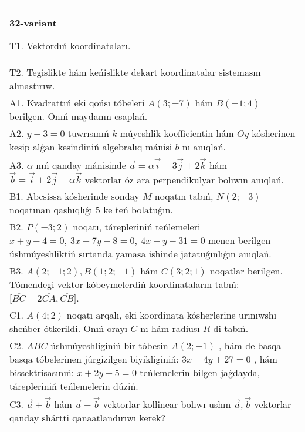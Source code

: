 \documentclass{article}
\begin{document}
\begin{tabular}{m{17cm}}
\textbf{32-variant}
\newline

T1. 
Vektordıń koordinataları.
 \\
T2. Tegislikte hám keńislikte dekart koordinatalar sistemasın almastırıw. 
 \\
A1. 
Kvadrattıń eki qońsı tóbeleri $A(3; -7)$ hám
$B(-1;4)$ berilgen. Onıń maydanın esaplań.
 \\
A2. 
$y-3=0$ tuwrısınıń $k$ múyeshlik
koefficientin hám $Oy$ kósherinen kesip alǵan kesindiniń algebralıq
mánisi $b$ nı anıqlań.
 \\
A3. 
$\alpha$
nıń qanday mánisinde
$\overrightarrow{a} = \alpha\overrightarrow{i} - 3\overrightarrow{j} + 2\overrightarrow{k}$
hám
$\overrightarrow{b} = \overrightarrow{i} + 2\overrightarrow{j} - \alpha\overrightarrow{k}$
vektorlar óz ara perpendikulyar bolıwın anıqlań. 
 \\
B1. 
Abcsissa kósherinde sonday $M$ noqatın tabıń,
\(N(2;-3)\) noqatınan qashıqlıǵı 5 ke teń bolatuǵın.
 \\
B2. 
\(P(-3;2)\) noqatı, tárepleriniń teńlemeleri
\(x+y-4=0,\ 3x-7y+8=0,\ 4x-y-31=0\) menen
berilgen úshmúyeshliktiń sırtanda yamasa ishinde jatatuǵınlıǵın anıqlań.
 \\
B3. 
$A (2; -1;2),B (1;2; - 1) $ hám $C (3;2;1) $ noqatlar berilgen. Tómendegi vektor kóbeymelerdiń koordinataların tabıń: 
$\lbrack\overline{BC} - 2\overline{CA},\overline{CB}\rbrack$.
 \\
C1. \(A(4;2)\) noqatı arqalı, eki koordinata kósherlerine
urınıwshı sheńber ótkerildi. Onıń orayı $C$ nı hám radiusı
$R$ di tabıń.
 \\
C2. 
$ABC$ úshmúyeshliginiń bir tóbesin \(A(2; - 1)\) , hám
de basqa-basqa tóbelerinen júrgizilgen biyikliginiń:
\(3x - 4y + 27 = 0\) , hám bissektrisasınıń: \(x + 2y - 5 = 0\) 
teńlemelerin bilgen jaǵdayda, tárepleriniń teńlemelerin dúziń.
 \\
C3. 
\(\vec{a}+\vec{b}\) hám \(\vec{a} - \vec{b}\) vektorlar kollinear bolıwı ushın \(\vec{a},\vec{b}\) vektorlar qanday shártti qanaatlandırıwı kerek?
 \\

\end{tabular}
\vspace{1cm}
\end{document}
